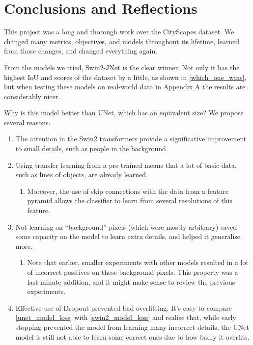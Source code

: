 \section{Conclusions and Reflections}

This project was a long and thorough work over the CityScapes dataset.
We changed many metrics, objectives, and models throughout its lifetime, learned from those changes, and changed everything again.

From the models we tried, Swin2-JNet is the clear winner.
Not only it has the highest IoU and \iiouc{} scores of the dataset by a little, as shown in \cref{which_one_wins}, but when testing these models on real-world data in \hyperref[hackneyscapes]{Appendix A} the results are considerably nicer.

Why is this model better than UNet, which has an equivalent size?
We propose several reasons.
\begin{enumerate}[topsep=0pt]
	\item The attention in the Swin2 transformers provide a significative improvement to small details, such as people in the background.
	\item Using transfer learning from a pre-trained means that a lot of basic data, such as lines of objects, are already learned.
		\begin{enumerate}
			\item Moreover, the use of skip connections with the data from a feature pyramid allows the classifier to learn from several resolutions of this feature.
		\end{enumerate}
	\item Not learning on ``background'' pixels (which were mostly arbitrary) saved some capacity on the model to learn extra details, and helped it generalise more.
		\begin{enumerate}
			\item Note that earlier, smaller experiments with other models resulted in a lot of incorrect positives on these background pixels.
				This property was a last-minute addition, and it might make sense to review the previous experiments.
		\end{enumerate}
	\item Effective use of Dropout prevented bad overfitting.
		It's easy to compare \cref{unet_model_loss} with \cref{swin2_model_loss} and realise that, while early stopping prevented the model from learning many incorrect details, the UNet model is still not able to learn some correct ones due to how badly it overfits.
\end{enumerate}

